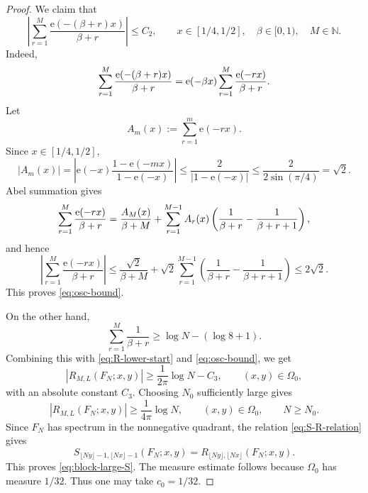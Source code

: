 \documentclass[10pt,a4paper]{amsart}
\begin{document}
\begin{proof}
We claim that 
\begin{equation}  \label{eq:osc-bound}
\left|\sum_{r=1}^{M}\frac{\mathrm{e}\!\left(-(\beta+r)x\right)}{\beta+r}%
\right| \le C_2, \qquad x\in[1/4,1/2],\quad \beta\in[0,1),\quad M\in\mathbb{N%
}.
\end{equation}
Indeed, 
\begin{equation*}
\sum_{r=1}^{M}\frac{\mathrm{e}\!\left(-(\beta+r)x\right)}{\beta+r} =\mathrm{e%
}\!\left(-\beta x\right)\sum_{r=1}^{M}\frac{\mathrm{e}\!\left(-rx\right)}{%
\beta+r}.
\end{equation*}
Let 
\begin{equation*}
A_m(x):=\sum_{r=1}^{m}\mathrm{e}\!\left(-rx\right).
\end{equation*}
Since $x\in[1/4,1/2]$, 
\begin{equation*}
\left|A_m(x)\right| =\left|\mathrm{e}\!\left(-x\right)\frac{1-\mathrm{e}%
\!\left(-mx\right)}{1-\mathrm{e}\!\left(-x\right)}\right| \le \frac2{\left|1-%
\mathrm{e}\!\left(-x\right)\right|} \le \frac2{2\sin(\pi/4)}=\sqrt2.
\end{equation*}
Abel summation gives 
\begin{equation*}
\sum_{r=1}^{M}\frac{\mathrm{e}\!\left(-rx\right)}{\beta+r} =\frac{A_M(x)}{%
\beta+M} +\sum_{r=1}^{M-1} A_r(x)
\left(\frac1{\beta+r}-\frac1{\beta+r+1}\right),
\end{equation*}
and hence 
\begin{equation*}
\left|\sum_{r=1}^{M}\frac{\mathrm{e}\!\left(-rx\right)}{\beta+r}\right| \le 
\frac{\sqrt2}{\beta+M} +\sqrt2\sum_{r=1}^{M-1}
\left(\frac1{\beta+r}-\frac1{\beta+r+1}\right) \le 2\sqrt2.
\end{equation*}
This proves \eqref{eq:osc-bound}.

On the other hand, 
\begin{equation*}
\sum_{r=1}^{M}\frac{1}{\beta +r}\geq \log N-(\log 8+1).
\end{equation*}%
Combining this with \eqref{eq:R-lower-start} and \eqref{eq:osc-bound}, we
get 
\begin{equation*}
\left\vert R_{M,L}(F_{N};x,y)\right\vert \geq \frac{1}{2\pi }\log
N-C_{3},\qquad (x,y)\in \Omega _{0},
\end{equation*}%
with an absolute constant $C_{3}$. Choosing $N_0$ sufficiently large gives 
\begin{equation*}
\left|R_{M,L}(F_N;x,y)\right| \ge \frac{1}{4\pi}\log N, \qquad
(x,y)\in\Omega_0, \qquad N\ge N_0.
\end{equation*}
Since $F_N$ has spectrum in the nonnegative quadrant, the relation %
\eqref{eq:S-R-relation} gives 
\begin{equation*}
S_{\lfloor Ny\rfloor-1,\lfloor Nx\rfloor-1}(F_N;x,y) =R_{\lfloor
Ny\rfloor,\lfloor Nx\rfloor}(F_N;x,y).
\end{equation*}
This proves \eqref{eq:block-large-S}. The measure estimate follows because $%
\Omega_0$ has measure $1/32$. Thus one may take $c_0=1/32$.
\end{proof}
\end{document}
